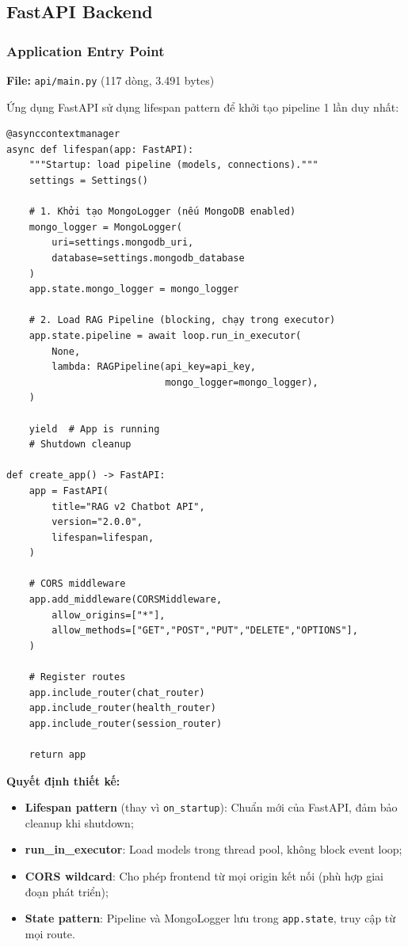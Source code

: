 \documentclass[../DoAn.tex]{subfiles}
\begin{document}
\subsection{FastAPI Backend}

\subsubsection{Application Entry Point}
\textbf{File:} \texttt{api/main.py} (117 dòng, 3.491 bytes)

Ứng dụng FastAPI sử dụng lifespan pattern để khởi tạo pipeline 1 lần duy nhất:
\begin{verbatim}
@asynccontextmanager
async def lifespan(app: FastAPI):
    """Startup: load pipeline (models, connections)."""
    settings = Settings()

    # 1. Khởi tạo MongoLogger (nếu MongoDB enabled)
    mongo_logger = MongoLogger(
        uri=settings.mongodb_uri,
        database=settings.mongodb_database
    )
    app.state.mongo_logger = mongo_logger

    # 2. Load RAG Pipeline (blocking, chạy trong executor)
    app.state.pipeline = await loop.run_in_executor(
        None,
        lambda: RAGPipeline(api_key=api_key,
                            mongo_logger=mongo_logger),
    )

    yield  # App is running
    # Shutdown cleanup

def create_app() -> FastAPI:
    app = FastAPI(
        title="RAG v2 Chatbot API",
        version="2.0.0",
        lifespan=lifespan,
    )

    # CORS middleware
    app.add_middleware(CORSMiddleware,
        allow_origins=["*"],
        allow_methods=["GET","POST","PUT","DELETE","OPTIONS"],
    )

    # Register routes
    app.include_router(chat_router)
    app.include_router(health_router)
    app.include_router(session_router)

    return app
\end{verbatim}

\textbf{Quyết định thiết kế:}
\begin{itemize}
    \item \textbf{Lifespan pattern} (thay vì \texttt{on\_startup}): Chuẩn mới của FastAPI, đảm bảo cleanup khi shutdown;
    \item \textbf{run\_in\_executor}: Load models trong thread pool, không block event loop;
    \item \textbf{CORS wildcard}: Cho phép frontend từ mọi origin kết nối (phù hợp giai đoạn phát triển);
    \item \textbf{State pattern}: Pipeline và MongoLogger lưu trong \texttt{app.state}, truy cập từ mọi route.
\end{itemize}
\end{document}
